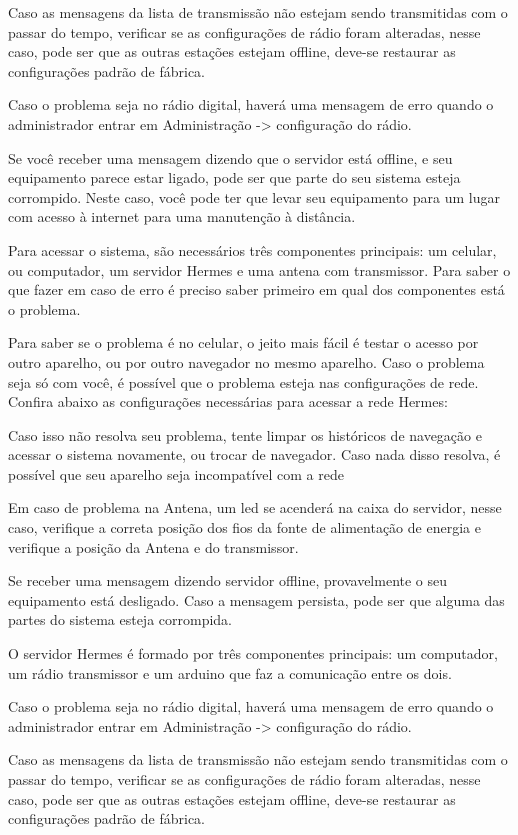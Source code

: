 \documentclass[11pt,a4paper]{article}
\begin{document}

Caso as mensagens da lista de transmissão não estejam sendo transmitidas com o passar do tempo, verificar se as configurações de rádio foram alteradas, nesse caso, pode ser que as outras estações estejam offline, deve-se restaurar as configurações padrão de fábrica.


Caso o problema seja no rádio digital, haverá uma mensagem de erro quando o administrador entrar em Administração -> configuração do rádio.

Se você receber uma mensagem dizendo que o servidor está offline, e seu equipamento parece estar ligado, pode ser que parte do seu sistema esteja corrompido. Neste caso, você pode ter que levar seu equipamento para um lugar com acesso à internet para uma manutenção à distância.




Para acessar o sistema, são necessários três componentes principais: um celular, ou computador, um servidor Hermes e uma antena com transmissor. 
Para saber o que fazer em caso de erro é preciso saber primeiro em qual dos componentes está o problema.

Para saber se o problema é no celular, o jeito mais fácil é testar o acesso por outro aparelho, ou por outro navegador no mesmo aparelho. Caso o problema seja só com você, é possível que o problema esteja nas configurações de rede. Confira abaixo as configurações necessárias para acessar a rede Hermes:

Caso isso não resolva seu problema, tente limpar os históricos de navegação e acessar o sistema novamente, ou trocar de navegador. Caso nada disso resolva, é possível que seu aparelho seja incompatível com a rede

Em caso de problema na Antena, um led se acenderá na caixa do servidor, nesse caso, verifique a correta posição dos fios da fonte de alimentação de energia e verifique a posição da Antena e do transmissor.

Se receber uma mensagem dizendo servidor offline, provavelmente o seu equipamento está desligado. Caso a mensagem persista, pode ser que alguma das partes do sistema esteja corrompida. 

O servidor Hermes é formado por três componentes principais: um computador, um rádio transmissor e um arduino que faz a comunicação entre os dois.

Caso o problema seja no rádio digital, haverá uma mensagem de erro quando o administrador entrar em Administração -> configuração do rádio. 

Caso as mensagens da lista de transmissão não estejam sendo transmitidas com o passar do tempo, verificar se as configurações de rádio foram alteradas, nesse caso, pode ser que as outras estações estejam offline, deve-se restaurar as configurações padrão de fábrica.
\end{document}
